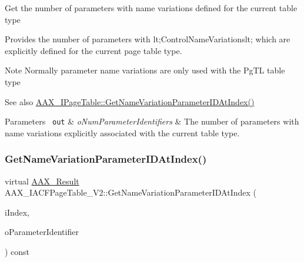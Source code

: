 Get the number of parameters with name variations defined for the current table type

Provides the number of parameters with {\ttfamily lt;Control\+Name\+Variationslt;} which are explicitly defined for the current page table type.

\begin{DoxyNote}{Note}
Normally parameter name variations are only used with the {\ttfamily \textquotesingle{}Pg\+TL\textquotesingle{}} table type
\end{DoxyNote}

\begin{DoxyItemize}
\item \begin{DoxySeeAlso}{See also}
\mbox{\hyperlink{a01849_ac505024dd195c1965c54acac8f1f3016}{A\+A\+X\+\_\+\+I\+Page\+Table\+::\+Get\+Name\+Variation\+Parameter\+I\+D\+At\+Index()}}
\end{DoxySeeAlso}

\begin{DoxyParams}[1]{Parameters}
\mbox{\texttt{ out}}  & {\em o\+Num\+Parameter\+Identifiers} & The number of parameters with name variations explicitly associated with the current table type. \\
\hline
\end{DoxyParams}

\end{DoxyItemize}\mbox{\label{a01729_ac342780ed3567c75d8a68458f0a4ff0c}} 
\subsubsection{\texorpdfstring{GetNameVariationParameterIDAtIndex()}{GetNameVariationParameterIDAtIndex()}}
{\footnotesize\ttfamily virtual \mbox{\hyperlink{a00392_a4d8f69a697df7f70c3a8e9b8ee130d2f}{A\+A\+X\+\_\+\+Result}} A\+A\+X\+\_\+\+I\+A\+C\+F\+Page\+Table\+\_\+\+V2\+::\+Get\+Name\+Variation\+Parameter\+I\+D\+At\+Index (\begin{DoxyParamCaption}\item[{int32\+\_\+t}]{i\+Index,  }\item[{\mbox{\hyperlink{a01873}{A\+A\+X\+\_\+\+I\+String}} \&}]{o\+Parameter\+Identifier }\end{DoxyParamCaption}) const\hspace{0.3cm}{\ttfamily [pure virtual]}}





